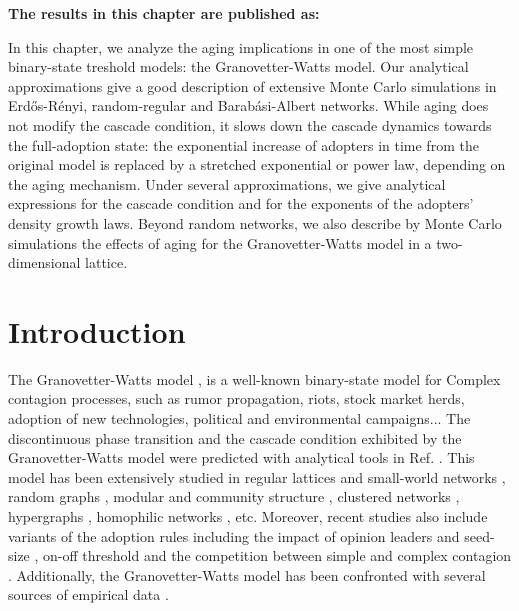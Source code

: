 \vspace{-1.5cm}
\small
\textbf{The results in this chapter are published as:}
\vspace{0.05 cm}

\normalsize
\vspace{0.5 cm}

In this chapter, we analyze the aging implications in one of the most simple binary-state treshold models: the Granovetter-Watts model. Our analytical approximations give a good description of extensive Monte Carlo simulations in Erd\H{o}s-R\'enyi, random-regular and Barab\'asi-Albert networks. While aging does not modify the cascade condition, it slows down the cascade dynamics towards the full-adoption state: the exponential increase of adopters in time from the original model is replaced by a stretched exponential or power law, depending on the aging mechanism. Under several approximations, we give analytical expressions for the cascade condition and for the exponents of the adopters' density growth laws. Beyond random networks, we also describe by Monte Carlo simulations the effects of aging for the Granovetter-Watts model in a two-dimensional lattice.

\section{\label{sec:Introduction} Introduction}

The Granovetter-Watts model \cite{granovetter-1978,watts-2002}, is a well-known binary-state model for Complex contagion processes, such as rumor propagation,  riots, stock market herds, adoption of new technologies, political and environmental campaigns... 
The discontinuous phase transition and the cascade condition exhibited by the Granovetter-Watts model were predicted with analytical tools in Ref. \cite{watts-2002}. This model has been extensively studied in regular lattices and small-world networks \cite{centola-2007}, random graphs \cite{gleeson-2007},  modular and community structure \cite{gleeson-2008}, clustered networks \cite{hackett-2011,hackett-2013}, hypergraphs \cite{de-arruda-2020}, homophilic networks \cite{diaz-diaz-2022}, etc. Moreover, recent studies also include variants of the adoption rules including
the impact of opinion leaders \cite{liu-2018} and seed-size \cite{singh-2013}, on-off threshold \cite{dodds-2013} and the competition between simple and complex contagion \cite{czaplicka-2016,min-2018,min-2018-dual,diaz-diaz-2022,min2023threshold}. Additionally, the Granovetter-Watts model has been confronted with several sources of empirical data \cite{centola-2010,karimi-2013,karsai-2014,rosenthal-2015,karsai-2016,mnsted-2017,unicomb-2018,guilbeault-2021}.


